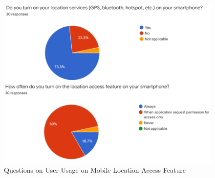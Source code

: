 \begin{enumerate}[a)]
\begin{itemize}
\begin{figure}[H]
                \includegraphics[width=\textwidth]{img/findings-3.png}
                \caption{Questions on User Usage on Mobile Location Access Feature}
                \label{fig:findings-3}
              \end{figure}


\end{itemize}
\end{enumerate}
